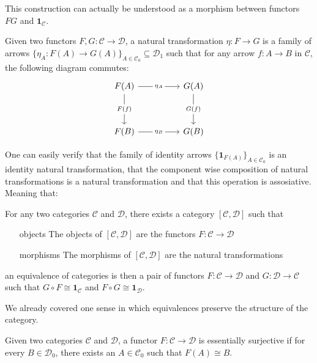 This construction can actually be understood as a morphism between functors
$FG$ and $\mathbf{1}_{\mathcal{C}}$.
\begin{definition}
    Given two functors $F,G:\mathcal{C}\to\mathcal{D}$,
    a natural transformation $\eta:F\to G$ is a family of arrows
    $\{\eta_A:F(A)\to G(A)\}_{A\in\mathcal{C}_0}\subseteq\mathcal{D}_1$ 
    such that for any arrow $f:A\to B$ in $\mathcal{C}$,
    the following diagram commutes:
    \[\begin{tikzcd}
        {F(A)} && {G(A)} \\
        \\
        {F(B)} && {G(B)}
        \arrow["{F(f)}"{description}, from=1-1, to=3-1]
        \arrow["{\eta_A}"{description}, from=1-1, to=1-3]
        \arrow["{\eta_B}"{description}, from=3-1, to=3-3]
        \arrow["{G(f)}"{description}, from=1-3, to=3-3]
    \end{tikzcd}\]
\end{definition}
One can easily verify that the family of 
identity arrows $\{\mathbf{1}_{F(A)}\}_{A\in\mathcal{C}_0}$
is an identity natural transformation,
that the component wise composition of natural transformations
is a natural transformation and that this operation is assosiative.
Meaning that:
\begin{definition}
    For any two categories $\mathcal{C}$ and $\mathcal{D}$,
    there exists a category $[\mathcal{C},\mathcal{D}]$ such that
    \begin{itemize}
        \item[objects] The objects of $[\mathcal{C},\mathcal{D}]$ are the functors $F:\mathcal{C}\to\mathcal{D}$
        \item[morphisms] The morphisms of $[\mathcal{C},\mathcal{D}]$ are the natural transformations
    \end{itemize}
\end{definition}
an equivalence of categories is then
a pair of
functors $F:\mathcal{C}\to\mathcal{D}$ 
and $G:\mathcal{D}\to\mathcal{C}$
such that
$G\circ F\cong \mathbf{1}_{\mathcal{C}}$
and $F\circ G\cong \mathbf{1}_{\mathcal{D}}$.

We already covered one sense in which equivalences preserve
the structure of the category.
\begin{definition}
    Given two categories $\mathcal{C}$ and $\mathcal{D}$,
    a functor $F:\mathcal{C}\to\mathcal{D}$ is essentially surjective 
    if for every $B\in\mathcal{D}_0$, there exists an 
    $A\in\mathcal{C}_0$
    such that $F(A)\cong B$.
\end{definition}

